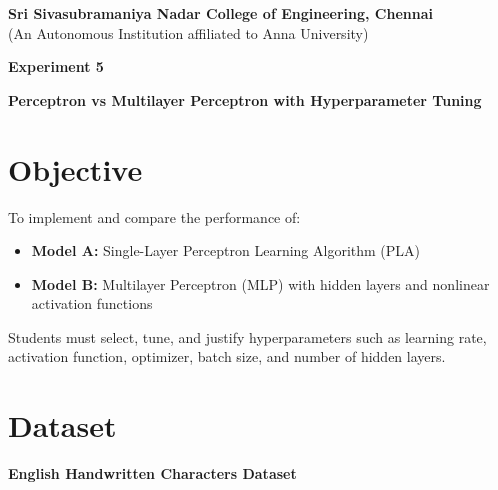 \documentclass[11pt]{article}
\begin{document}
\begin{center}
    \Large \textbf{Sri Sivasubramaniya Nadar College of Engineering, Chennai} \\
    \large (An Autonomous Institution affiliated to Anna University) \\
    \vspace{0.3cm}
\end{center}

\begin{table}[h!]
\renewcommand{\arraystretch}{1.5}
\centering
{}
\end{table}

\begin{center}
    \textbf{\Large Experiment 5}
\end{center}

\begin{center}
    \textbf{Perceptron vs Multilayer Perceptron with Hyperparameter Tuning}
\end{center}

\section*{Objective}
To implement and compare the performance of:
\begin{itemize}
    \item \textbf{Model A:} Single-Layer Perceptron Learning Algorithm (PLA)
    \item \textbf{Model B:} Multilayer Perceptron (MLP) with hidden layers and nonlinear activation functions
\end{itemize}

Students must select, tune, and justify hyperparameters such as learning rate, activation function, optimizer, batch size, and number of hidden layers.

\section*{Dataset}
\textbf{English Handwritten Characters Dataset}
\end{document}
